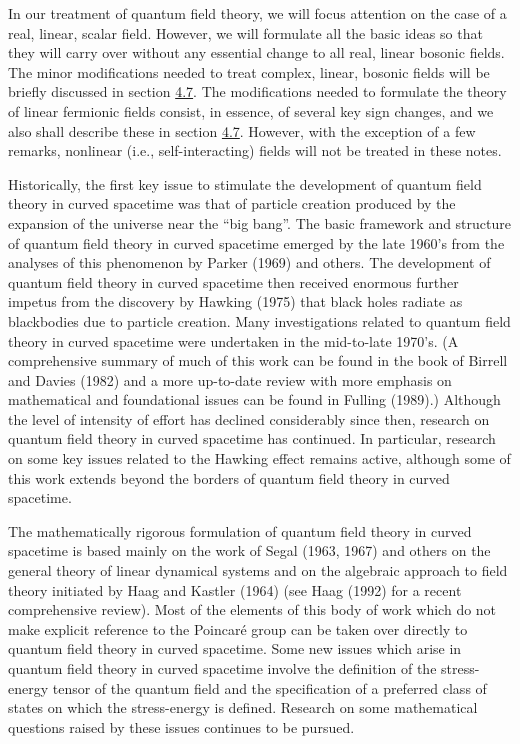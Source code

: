 \documentclass[11pt,a4paper]{article}
\begin{document}
In our treatment of quantum field theory, we will focus attention on the case of a real, linear, scalar field. However, we will formulate all the basic ideas so that they will carry over without any essential change to all real, linear bosonic fields. The minor modifications needed to treat complex, linear, bosonic fields will be briefly discussed in section \hyperlink{sec:4.7}{4.7}. The modifications needed to formulate the theory of linear fermionic fields consist, in essence, of several key sign changes, and we also shall describe these in section \hyperlink{sec:4.7}{4.7}. However, with the exception of a few remarks, nonlinear (i.e., self-interacting) fields will not be treated in these notes.

Historically, the first key issue to stimulate the development of quantum field theory in curved spacetime was that of particle creation produced by the expansion of the universe near the ``big bang''. The basic framework and structure of quantum field theory in \hypertarget{source-18}{} curved spacetime emerged by the late 1960's from the analyses of this phenomenon by Parker (1969) and others. The development of quantum field theory in curved spacetime then received enormous further impetus from the discovery by Hawking (1975) that black holes radiate as blackbodies due to particle creation. Many investigations related to quantum field theory in curved spacetime were undertaken in the mid-to-late 1970's. (A comprehensive summary of much of this work can be found in the book of Birrell and Davies (1982) and a more up-to-date review with more emphasis on mathematical and foundational issues can be found in Fulling (1989).) Although the level of intensity of effort has declined considerably since then, research on quantum field theory in curved spacetime has continued. In particular, research on some key issues related to the Hawking effect remains active, although some of this work extends beyond the borders of quantum field theory in curved spacetime.

The mathematically rigorous formulation of quantum field theory in curved spacetime is based mainly on the work of Segal (1963, 1967) and others on the general theory of linear dynamical systems and on the algebraic approach to field theory initiated by Haag and Kastler (1964) (see Haag (1992) for a recent comprehensive review). Most of the elements of this body of work which do not make explicit reference to the Poincaré group can be taken over directly to quantum field theory in curved spacetime. Some new issues which arise in quantum field theory in curved spacetime involve the definition of the stress-energy tensor of the quantum field and the specification of a preferred class of states on which the stress-energy is defined. Research on some mathematical questions raised by these issues continues to be pursued.
\end{document}
